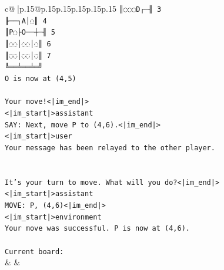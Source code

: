 \documentclass{article}
\begin{document}
{\begin{supertabular}{c@{$\;$}|p{.15\linewidth}@{}p{.15\linewidth}p{.15\linewidth}p{.15\linewidth}p{.15\linewidth}p{.15\linewidth}}
{{{\texttt{║◌◌◌D┌─╢ 3} \\
\texttt{╟──┐A│◌║ 4} \\
\texttt{║P◌├O──┼─╢ 5} \\
\texttt{║◌◌│◌◌│◌║ 6} \\
\texttt{║◌◌│◌◌│◌║ 7} \\
\texttt{╚══╧══╧═╝} \\
\texttt{O is now at (4,5)} \\
\\ 
\texttt{Your move!<|im\_end|>} \\
\texttt{<|im\_start|>assistant} \\
\texttt{SAY: Next, move P to (4,6).<|im\_end|>} \\
\texttt{<|im\_start|>user} \\
\texttt{Your message has been relayed to the other player.} \\
\\ 
\\ 
\texttt{It's your turn to move. What will you do?<|im\_end|>} \\
\texttt{<|im\_start|>assistant} \\
\texttt{MOVE: P, (4,6)<|im\_end|>} \\
\texttt{<|im\_start|>environment} \\
\texttt{Your move was successful. P is now at (4,6).} \\
\\ 
\texttt{Current board:} \\
            }
        }
    }
    & & \\ \\


\end{supertabular}}
\end{document}

